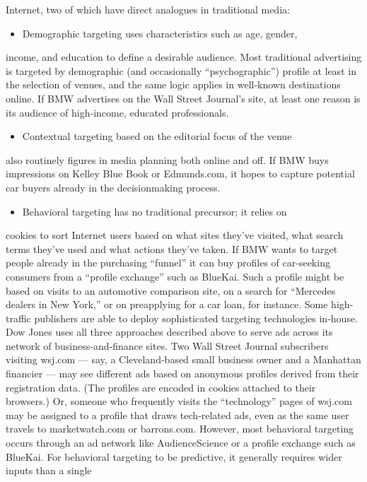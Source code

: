 Internet, two of which have direct analogues in traditional media:
\begin{itemize}
\item Demographic targeting uses characteristics such as age, gender,
\end{itemize}
income, and education to define a desirable audience. Most
traditional advertising is targeted by demographic (and
occasionally ``psychographic'') profile at least in the selection of
venues, and the same logic applies in well‐known destinations
online. If BMW advertises on the Wall Street Journal’s site, at
least one reason is its audience of high‐income, educated
professionals.
\begin{itemize}
\item Contextual targeting based on the editorial focus of the venue
\end{itemize}
also routinely figures in media planning both online and off. If
BMW buys impressions on Kelley Blue Book or Edmunds.com,
it hopes to capture potential car buyers already in the decisionmaking
process.
\begin{itemize}
\item Behavioral targeting has no traditional precursor; it relies on
\end{itemize}
cookies to sort Internet users based on what sites they’ve
visited, what search terms they’ve used and what actions
they’ve taken. If BMW wants to target people already in the
purchasing ``funnel'' it can buy profiles of car‐seeking
consumers from a ``profile exchange'' such as BlueKai. Such a
profile might be based on visits to an automotive comparison
site, on a search for ``Mercedes dealers in New York,'' or on preapplying
for a car loan, for instance.
Some high‐traffic publishers are able to deploy sophisticated targeting
technologies in‐house. Dow Jones uses all three approaches described
above to serve ads across its network of business‐and‐finance sites. Two
Wall Street Journal subscribers visiting wsj.com — say, a Cleveland‐based
small business owner and a Manhattan financier — may see different ads
based on anonymous profiles derived from their registration data. (The
profiles are encoded in cookies attached to their browsers.) Or, someone
who frequently visits the ``technology'' pages of wsj.com may be assigned
to a profile that draws tech‐related ads, even as the same user travels to
marketwatch.com or barrons.com.
However, most behavioral targeting occurs through an ad network like
AudienceScience or a profile exchange such as BlueKai. For behavioral
targeting to be predictive, it generally requires wider inputs than a single
